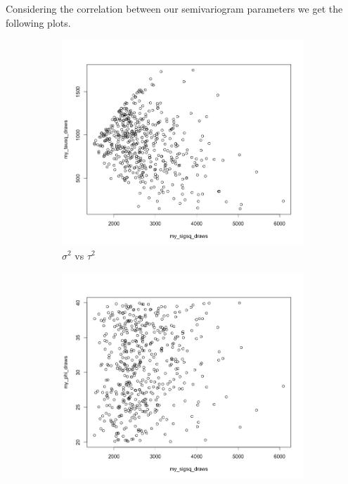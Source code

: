 \documentclass[12pt]{article}
\makeatletter
\theoremstyle{homework}
\newenvironment{exercise}[1]
{\def\@currentlabel{#1}\exercisecore}
{\endexercisecore}
\makeatother
\begin{document}
\begin{exercise}{3}
  Considering the correlation between our semivariogram parameters we get the following plots. 
  \begin{figure}[H]
    \centering
    \caption{Scatterplots for Semivariogram parameters.}
    \begin{subfigure}[b]{0.45\textwidth}
        \centering
        \includegraphics[width=\textwidth]{Rplot17.png}
        \caption{$\sigma^2$ vs $\tau^2$}
    \end{subfigure}
    \hfill
    \begin{subfigure}[b]{0.45\textwidth}
        \centering
        \includegraphics[width=\textwidth]{Rplot18.png}

\end{subfigure}
\end{figure}
\end{exercise}
\end{document}
